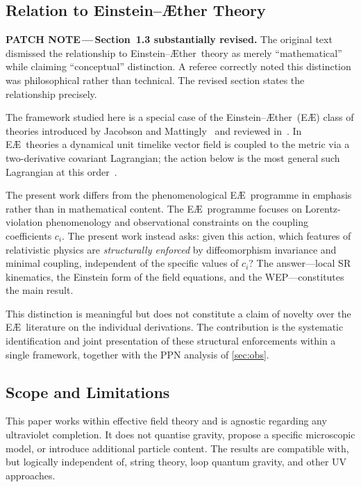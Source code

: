 \documentclass[12pt,a4paper]{article}
\newcommand{\patchnote}[1]{%
  \begin{patchbox}
    {\small\color{patchtext}\textbf{PATCH NOTE\,---\,}#1}
  \end{patchbox}}
\newcommand{\Aether}{\AE ther}
\begin{document}
\subsection{Relation to Einstein--\texorpdfstring{\Aether}{AEther} Theory}
\label{sec:aether}

\patchnote{\textbf{Section~1.3 substantially revised.}
The original text dismissed the relationship to Einstein--\Aether\ theory as
merely ``mathematical'' while claiming ``conceptual'' distinction. A referee
correctly noted this distinction was philosophical rather than technical. The
revised section states the relationship precisely.}

The framework studied here is a special case of the Einstein--\Aether\ (E\AE)
class of theories introduced by Jacobson and Mattingly~\citep{jacobson2001}
and reviewed in~\citep{jacobson2008}. In E\AE\ theories a dynamical unit
timelike vector field is coupled to the metric via a two-derivative covariant
Lagrangian; the action below is the most general such Lagrangian at this
order~\citep{jacobson2001}.

The present work differs from the phenomenological E\AE\ programme in
emphasis rather than in mathematical content. The E\AE\ programme focuses on
Lorentz-violation phenomenology and observational constraints on the coupling
coefficients $c_i$. The present work instead asks: given this action, which
features of relativistic physics are \emph{structurally enforced} by
diffeomorphism invariance and minimal coupling, independent of the specific
values of $c_i$? The answer---local SR kinematics, the Einstein form of the
field equations, and the WEP---constitutes the main result.

This distinction is meaningful but does not constitute a claim of novelty over
the E\AE\ literature on the individual derivations. The contribution is the
systematic identification and joint presentation of these structural
enforcements within a single framework, together with the PPN analysis of
\cref{sec:obs}.

\subsection{Scope and Limitations}

This paper works within effective field theory and is agnostic regarding any
ultraviolet completion. It does not quantise gravity, propose a specific
microscopic model, or introduce additional particle content. The results are
compatible with, but logically independent of, string theory, loop quantum
gravity, and other UV approaches.
\end{document}
